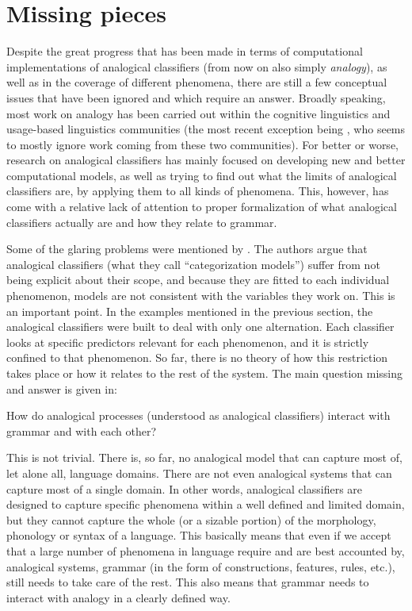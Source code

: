 \section{Missing pieces}

Despite the great progress that has been made in terms of computational implementations of analogical classifiers (from now on also simply \textit{analogy}), as well as in the coverage of different phenomena, there are still a few conceptual issues that have been ignored and which require an answer. Broadly speaking, most work on analogy has been carried out within the cognitive linguistics and usage-based linguistics communities (the most recent exception being \textcite{Gouskova.2015}, who seems to mostly ignore work coming from these two communities). For better or worse, research on analogical classifiers has mainly focused on developing new and better computational models, as well as trying to find out what the limits of analogical classifiers are, by applying them to all kinds of phenomena. This, however, has come with a relative lack of attention to proper formalization of what analogical classifiers actually are and how they relate to grammar.

Some of the glaring problems were mentioned by \textcite{Wills.2012}. The authors argue that analogical classifiers (what they call ``categorization models'') suffer from not being explicit about their scope, and because they are fitted to each individual phenomenon, models are not consistent with the variables they work on. This is an important point. In the examples mentioned in the previous section, the analogical classifiers were built to deal with only one alternation. Each classifier looks at specific predictors relevant for each phenomenon, and it is strictly confined to that phenomenon. So far, there is no theory of how this restriction takes place or how it relates to the rest of the system. The main question missing and answer is given in:

\begin{exe}
    \ex \label{question} How do analogical processes (understood as analogical classifiers) interact with grammar and with each other?
\end{exe}

This is not trivial. There is, so far, no analogical model that can capture most of, let alone all, language domains. There are not even analogical systems that can capture most of a single domain. In other words, analogical classifiers are designed to capture specific phenomena within a well defined and limited domain, but they cannot capture the whole (or a sizable portion) of the morphology, phonology or syntax of a language. This basically means that even if we accept that a large number of phenomena in language require and are best accounted by, analogical systems, grammar (in the form of constructions, features, rules, etc.), still needs to take care of the rest. This also means that grammar needs to interact with analogy in a clearly defined way.

